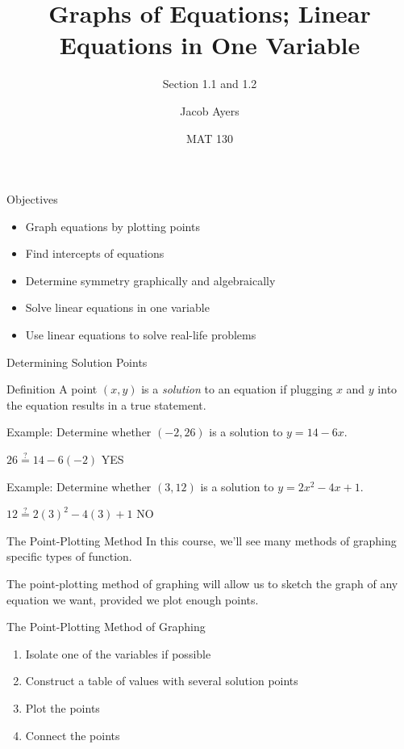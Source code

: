 \documentclass{beamer}
\title[1.1 and 1.2]{Graphs of Equations; Linear Equations in One Variable}
\subtitle{Section 1.1 and 1.2}
\author{Jacob Ayers}
\institute{Lesson \#4}
\date{MAT 130}
\begin{document}
\begin{frame}
\titlepage
\end{frame}

\begin{frame}[t]{Objectives}
\begin{itemize}
	\item Graph equations by plotting points
	\item Find intercepts of equations
	\item Determine symmetry graphically and algebraically
	\item Solve linear equations in one variable
	\item Use linear equations to solve real-life problems
\end{itemize}
\end{frame}

\begin{frame}[t]{Determining Solution Points}
\begin{block}{Definition}
A point $(x,y)$ is a \textit{solution} to an equation if plugging $x$ and $y$ into the equation results in a true statement.
\end{block} \vspace{12pt}

\pause

Example: Determine whether $(-2, 26)$ is a solution to $y = 14 - 6x$.

\pause

$26 \stackrel{?}{=} 14 - 6(-2)$ \hspace{1in} YES \vspace{12pt}

\pause

Example: Determine whether $(3, 12)$ is a solution to $y = 2x^2 - 4x + 1$.

\pause

$12 \stackrel{?}{=} 2(3)^2 - 4(3) + 1$ \hspace{1in} NO
\end{frame}

\begin{frame}[t]{The Point-Plotting Method}
In this course, we'll see many methods of graphing specific types of function.

The point-plotting method of graphing will allow us to sketch the graph of any equation we want, provided we plot enough points.

\pause

\begin{block}{The Point-Plotting Method of Graphing}
\begin{enumerate}[1)]
\item Isolate one of the variables if possible
\item Construct a table of values with several solution points
\item Plot the points
\item Connect the points
\end{enumerate}
\end{block}
\end{frame}
\end{document}
